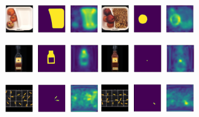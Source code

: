 \begin{figure}[H]
    \captionsetup[subfigure]{justification=centering}
    \centering
    \begin{subfigure}[b]{\textwidth}
        \centering
        \includegraphics[width=0.45\textwidth]{figures/appendix/appendix_patchcore/BB/breakfast_box_test_logical_anomalies_034.png}
        \hfill
        \includegraphics[width=0.45\textwidth]{figures/appendix/appendix_patchcore/BB/breakfast_box_test_structural_anomalies_024.png}

    \end{subfigure}
    \begin{subfigure}[b]{\textwidth}
        \centering
        \includegraphics[width=0.45\textwidth]{figures/appendix/appendix_patchcore/JB/juice_bottle_test_logical_anomalies_090.png}
        \hfill
        \includegraphics[width=0.45\textwidth]{figures/appendix/appendix_patchcore/JB/juice_bottle_test_structural_anomalies_037.png}

    \end{subfigure}
    \begin{subfigure}[b]{\textwidth}
        \centering
        \includegraphics[width=0.45\textwidth]{figures/appendix/appendix_patchcore/PP/pushpins_test_logical_anomalies_025.png}
        \hfill
        \includegraphics[width=0.45\textwidth]{figures/appendix/appendix_patchcore/PP/pushpins_test_structural_anomalies_064.png}


\end{subfigure}
\end{figure}
